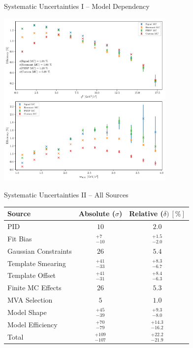 \documentclass[serif]{beamer}
\begin{document}
\begin{frame}[t]{Systematic Uncertainties I -- Model Dependency}

\vspace{-3mm}
\small

\begin{center}
	\includegraphics[width=0.65\textwidth]{fig/efficiencies}
\end{center}	


\end{frame}


\begin{frame}[t]{Systematic Uncertainties II -- All Sources}

\vspace{5mm}

\begin{table}[H]
	\centering
	\begin{tabular}{l|c|c}
		Source & Absolute ($\sigma$) & Relative ($\delta)~[\%]$ \\
		\toprule
		PID & $10$ & $2.0$ \\
		Fit Bias & $ {}^{+7}_{-10}$ & ${}^{+1.5}_{-2.0}$ \\
		Gaussian Constraints & $26$ & $5.4$ \\
		Template Smearing & ${}^{+41}_{-33}$ & ${}^{+8.3}_{-6.7}$ \\
		Template Offset & ${}^{+41}_{-31}$ & ${}^{+8.4}_{-6.3}$ \\
		Finite MC Effects & $26$ & $5.3$ \\
		MVA Selection & $5$ & $1.0$\\
		Model Shape & ${}^{+45}_{-39}$ & ${}^{+9.3}_{-8.0}$ \\
		Model Efficiency & ${}^{+70}_{-79}$ & ${}^{+14.3}_{-16.2}$ \\
		\midrule
		Total & ${} ^{+109}_{-107}$ & ${}^{+22.2}_{-21.9}$ \\
		\bottomrule
	\end{tabular}
\end{table}


\end{frame}
\end{document}
